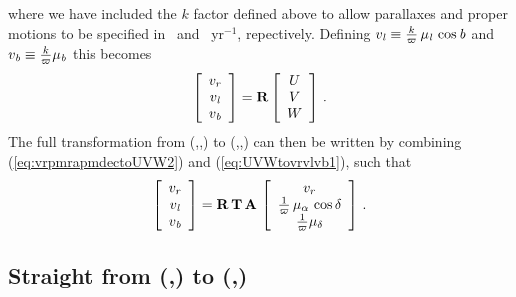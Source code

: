 where we have included the $k$ factor defined above to allow
parallaxes and proper motions to be specified in \arcsecs\ and
\arcsecs\ yr$^{-1}$, repectively. Defining $v_{\it l} \equiv
\frac{k}{\varpi}\,\mu_{\it l}\,\cos{\it b}$ and $v_{\it b} \equiv
\frac{k}{\varpi}\mu_{\it b}$ this becomes
\begin{equation}\label{eq:UVWtovrvlvb1}
\left[ \begin{array}{c} v_r  \\ v_{\it l}\\v_{\it b}\end{array} \right] = 
\mathbf{R} \left[ \begin{array}{c} U \\ V \\ W \end{array} \right]\, .
\end{equation}
The full transformation from (\vrr,\pmra,\pmdec) to (\vrr,\vll,\vbb)
can then be written by combining (\ref{eq:vrpmrapmdectoUVW2}) and
(\ref{eq:UVWtovrvlvb1}), such that
\begin{equation}\label{eq:UVWtovrvlvb2}
\left[ \begin{array}{c} v_r  \\ v_{\it l}\\v_{\it b}\end{array} \right] = 
\mathbf{R} \, \mathbf{T} \, \mathbf{A} \, \left[ \begin{array}{c} v_r  \\ \frac{1}{\varpi}\,\mu_{\alpha}\,\cos\delta\\\frac{1}{\varpi}\mu_{\delta}\end{array} \right]\, .
\end{equation}


\subsection{Straight from (\pmra,\pmdec) to (\pmll,\pmbb)}\label{sec:pmtrans}

